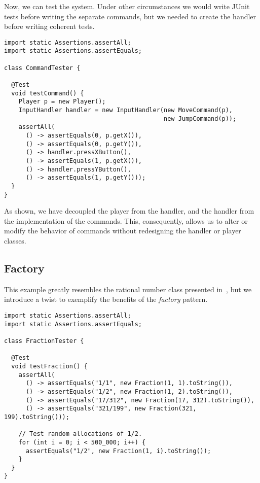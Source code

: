 Now, we can test the system.
Under other circumstances we would write JUnit tests before writing the separate commands, but we needed to create the handler before writing coherent tests. 

\begin{lstlisting}[language=MyJava]
import static Assertions.assertAll;
import static Assertions.assertEquals;

class CommandTester {

  @Test
  void testCommand() {
    Player p = new Player();
    InputHandler handler = new InputHandler(new MoveCommand(p), 
                                            new JumpCommand(p));
    assertAll(
      () -> assertEquals(0, p.getX()),
      () -> assertEquals(0, p.getY()),
      () -> handler.pressXButton(),
      () -> assertEquals(1, p.getX()),
      () -> handler.pressYButton(),
      () -> assertEquals(1, p.getY()));
  }
}
\end{lstlisting}

As shown, we have decoupled the player from the handler, and the handler from the implementation of the commands. 
This, consequently, allows us to alter or modify the behavior of commands without redesigning the handler or player classes.

\subsection{Factory}

This example greatly resembles the rational number class presented in~, but we introduce a twist to exemplify the benefits of the \emph{factory} pattern.

\begin{lstlisting}[language=MyJava]
import static Assertions.assertAll;
import static Assertions.assertEquals;

class FractionTester {

  @Test
  void testFraction() {
    assertAll(
      () -> assertEquals("1/1", new Fraction(1, 1).toString()),
      () -> assertEquals("1/2", new Fraction(1, 2).toString()),
      () -> assertEquals("17/312", new Fraction(17, 312).toString()),
      () -> assertEquals("321/199", new Fraction(321, 199).toString()));

    // Test random allocations of 1/2.
    for (int i = 0; i < 500_000; i++) {
      assertEquals("1/2", new Fraction(1, i).toString());
    }
  } 
}
\end{lstlisting}

